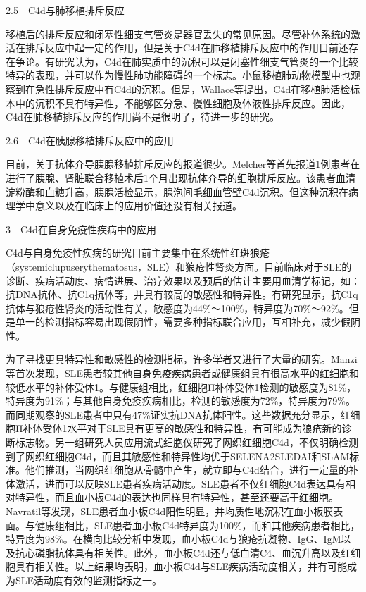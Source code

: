 2.5　C4d与肺移植排斥反应

移植后的排斥反应和闭塞性细支气管炎是器官丢失的常见原因。尽管补体系统的激活在排斥反应中起一定的作用，但是关于C4d在肺移植排斥反应中的作用目前还存在争论。有研究认为，C4d在肺实质中的沉积可以是闭塞性细支气管炎的一个比较特异的表现，并可以作为慢性肺功能障碍的一个标志。小鼠移植肺动物模型中也观察到在急性排斥反应中有C4d的沉积。但是，Wallace等提出，C4d在移植肺活检标本中的沉积不具有特异性，不能够区分急、慢性细胞及体液性排斥反应。因此，C4d在肺移植排斥反应的作用尚不是很明了，待进一步的研究。

2.6　C4d在胰腺移植排斥反应中的应用

目前，关于抗体介导胰腺移植排斥反应的报道很少。Melcher等首先报道1例患者在进行了胰腺、肾脏联合移植术后1个月出现抗体介导的细胞排斥反应。该患者血清淀粉酶和血糖升高，胰腺活检显示，腺泡间毛细血管壁C4d沉积。但这种沉积在病理学中意义以及在临床上的应用价值还没有相关报道。

3　C4d在自身免疫性疾病中的应用

C4d与自身免疫性疾病的研究目前主要集中在系统性红斑狼疮（systemiclupuserythematosus，SLE）和狼疮性肾炎方面。目前临床对于SLE的诊断、疾病活动度、病情进展、治疗效果以及预后的估计主要用血清学标记，如：抗DNA抗体、抗C1q抗体等，并具有较高的敏感性和特异性。有研究显示，抗C1q抗体与狼疮性肾炎的活动性有关，敏感度为44\%～100\%，特异度为70\%～92\%。但是单一的检测指标容易出现假阴性，需要多种指标联合应用，互相补充，减少假阴性。

为了寻找更具特异性和敏感性的检测指标，许多学者又进行了大量的研究。Manzi等首次发现，SLE患者较其他自身免疫疾病患者或健康组具有很高水平的红细胞和较低水平的补体受体1。与健康组相比，红细胞Π补体受体1检测的敏感度为81\%，特异度为91\%；与其他自身免疫疾病相比，检测的敏感度为72\%，特异度为79\%。而同期观察的SLE患者中只有47\%证实抗DNA抗体阳性。这些数据充分显示，红细胞Π补体受体1水平对于SLE具有更高的敏感性和特异性，有可能成为狼疮新的诊断标志物。另一组研究人员应用流式细胞仪研究了网织红细胞C4d，不仅明确检测到了网织红细胞C4d，而且其敏感性和特异性均优于SELENA2SLEDAI和SLAM标准。他们推测，当网织红细胞从骨髓中产生，就立即与C4d结合，进行一定量的补体激活，进而可以反映SLE患者疾病活动度。SLE患者不仅红细胞C4d表达具有相对特异性，而且血小板C4d的表达也同样具有特异性，甚至还要高于红细胞。Navratil等发现，SLE患者血小板C4d阳性明显，并均质性地沉积在血小板膜表面。与健康组相比，SLE患者血小板C4d特异度为100\%，而和其他疾病患者相比，特异度为98\%。在横向比较分析中发现，血小板C4d与狼疮抗凝物、IgG、IgM以及抗心磷脂抗体具有相关性。此外，血小板C4d还与低血清C4、血沉升高以及红细胞具有相关性。以上结果均表明，血小板C4d与SLE疾病活动度相关，并有可能成为SLE活动度有效的监测指标之一。

